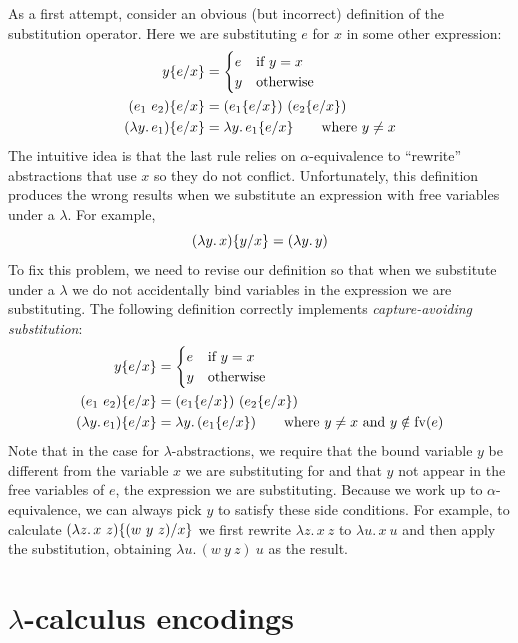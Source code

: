 As a first attempt, consider an obvious (but incorrect) definition of the substitution operator.
Here we are substituting $e$ for $x$ in some other expression:
\begin{align*}
  y\{e/x\}&=\begin{cases} e & \text{if } y=x\\ y & \text{otherwise}\end{cases}\\
  (e_1\ e_2)\{e/x\}&=(e_1\{e/x\})\ (e_2\{e/x\})\\
  (\lambda y.\,e_1)\{e/x\}&=\lambda y.\,e_1\{e/x\}\qquad\text{where } y\neq x
\end{align*}
The intuitive idea is that the last rule relies on $\alpha$-equivalence to ``rewrite'' abstractions
that use $x$ so they do not conflict. Unfortunately, this definition produces the wrong results
when we substitute an expression with free variables under a $\lambda$. For example,
\[
  (\lambda y.\,x)\{y/x\}=(\lambda y.\,y)
\]
To fix this problem, we need to revise our definition so that when we substitute under a $\lambda$
we do not accidentally bind variables in the expression we are substituting. The following
definition correctly implements \emph{capture-avoiding substitution}:
\begin{align*}
  y\{e/x\}&=\begin{cases} e & \text{if } y=x\\ y & \text{otherwise}\end{cases}\\
  (e_1\ e_2)\{e/x\}&=(e_1\{e/x\})\ (e_2\{e/x\})\\
  (\lambda y.\,e_1)\{e/x\}&=\lambda y.\,(e_1\{e/x\})\qquad\text{where } y\neq x\text{ and } y\notin\mathrm{fv}(e)
\end{align*}
Note that in the case for $\lambda$-abstractions, we require that the bound variable $y$ be
different from the variable $x$ we are substituting for and that $y$ not appear in the free
variables of $e$, the expression we are substituting. Because we work up to $\alpha$-equivalence,
we can always pick $y$ to satisfy these side conditions. For example, to calculate
$(\lambda z.\,x\ z)\{(w\ y\ z)/x\}$ we first rewrite $\lambda z.\,x\ z$ to $\lambda u.\,x\ u$
and then apply the substitution, obtaining $\lambda u.\,(w\ y\ z)\ u$ as the result.

\section{$\lambda$-calculus encodings}

